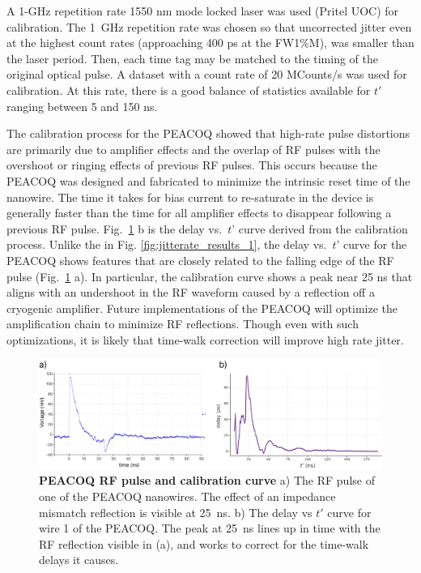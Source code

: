 \documentclass[11pt]{caltech_thesis} %
\begin{document}
A 1-GHz repetition rate 1550 nm mode locked laser was used (Pritel UOC) for calibration. The 1~GHz repetition rate was chosen so that uncorrected jitter even at the highest count rates (approaching 400 ps at the FW1\%M), was smaller than the laser period. Then, each time tag may be matched to the timing of the original optical pulse. A dataset with a count rate of 20 MCounts/s was used for calibration. At this rate, there is a good balance of statistics available for $t'$ ranging between 5 and 150 ns.

The calibration process for the PEACOQ showed that high-rate pulse distortions are primarily due to amplifier effects and the overlap of RF pulses with the overshoot or ringing effects of previous RF pulses. This occurs because the PEACOQ was designed and fabricated to minimize the intrinsic reset time of the nanowire. The time it takes for bias current to re-saturate in the device is generally faster than the time for all amplifier effects to disappear following a previous RF pulse. Fig.~\ref{fig:order_1st} b is the delay vs.~$t’$ curve derived from the calibration process. Unlike the in Fig. \ref{fig:jitterate_results_1}, the delay vs.~$t’$ curve for the PEACOQ shows features that are closely related to the falling edge of the RF pulse (Fig.~\ref{fig:order_1st} a). In particular, the calibration curve shows a peak near 25 ns that aligns with an undershoot in the RF waveform caused by a reflection off a cryogenic amplifier. Future implementations of the PEACOQ will optimize the amplification chain to minimize RF reflections. Though even with such optimizations, it is likely that time-walk correction will improve high rate jitter.

\hypertarget{fig:order_1st}{%
\begin{figure}
\centering
\includegraphics[width=1\textwidth,height=\textheight]{./chapter_03/figs/SOM_Figure_order_1st_v2_light.pdf}
\caption[{PEACOQ RF pulse and calibration curve}]{\textbf{PEACOQ RF pulse and calibration curve} a) The RF pulse of one of the PEACOQ nanowires. The effect of an impedance mismatch reflection is visible at 25~ns. b) The delay vs $t'$ curve for wire 1 of the PEACOQ. The peak at 25~ns lines up in time with the RF reflection visible in (a), and works to correct for the time-walk delays it causes.}
\label{fig:order_1st}
\end{figure}
}
\end{document}
